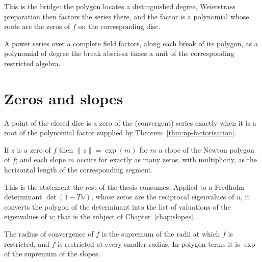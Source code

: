 This is the bridge: the polygon locates a distinguished degree, Weierstrass preparation then
factors the series there, and the factor is a polynomial whose roots are the zeros of $f$ on the
corresponding disc.

\begin{theorem}
  \label{thm:np-factorisation}
  \leanok
  A power series over a complete field factors, along each break of its polygon, as a polynomial
  of degree the break abscissa times a unit of the corresponding restricted algebra.
\end{theorem}

\section{Zeros and slopes}

\begin{theorem}
  \label{thm:np-zeros}
  \leanok
  A point of the closed disc is a zero of the (convergent) series exactly when it is a root of
  the polynomial factor supplied by Theorem~\ref{thm:np-factorisation}.
\end{theorem}

\begin{theorem}
  \label{thm:np-slope-reading}
  \leanok
  If $z$ is a zero of $f$ then $\lVert z \rVert = \exp(m)$ for $m$ a slope of the Newton polygon
  of $f$; and each slope $m$ occurs for exactly as many zeros, with multiplicity, as the
  horizontal length of the corresponding segment.
\end{theorem}

This is the statement the rest of the thesis consumes.  Applied to a Fredholm determinant
$\det(1 - Tu)$, whose zeros are the reciprocal eigenvalues of $u$, it converts the polygon of the
determinant into the list of valuations of the eigenvalues of $u$; that is the subject of
Chapter~\ref{chap:slopes}.

\begin{proposition}
  \label{prop:np-radius}
  \leanok
  The radius of convergence of $f$ is the supremum of the radii at which $f$ is restricted, and
  $f$ is restricted at every smaller radius.  In polygon terms it is $\exp$ of the supremum of
  the slopes.
\end{proposition}

